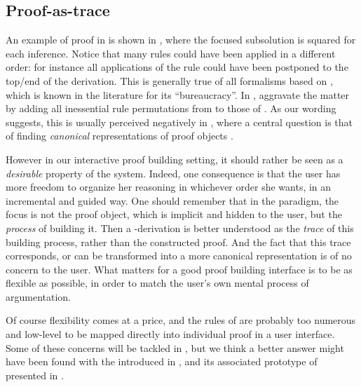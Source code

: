 \begin{scope}
\subsection{Proof-as-trace}

An example of proof in  is shown in , where the
focused subsolution is squared for each inference. Notice that many rules could
have been applied in a different order: for instance all applications of the
{} rule could have been postponed to the top/end of the derivation.
This is generally true of all formalisms based on , which is known in the
 literature for its ``bureaucracy''. In ,
 aggravate the matter by adding all inessential rule
permutations from  to those of . As our wording suggests,
this is usually perceived negatively in  , where a
central question is that of finding \emph{canonical} representations of proof
objects .

However in our interactive proof building setting, it should rather be seen as a
\emph{desirable} property of the system. Indeed, one consequence is that the
user has more freedom to organize her reasoning in whichever order she wants, in
an incremental and guided way. One should remember that in the
 paradigm, the focus is not the proof object, which is
implicit and hidden to the user, but the \emph{process} of building it. Then a
-derivation is better understood as the \emph{trace} of this building
process, rather than the constructed proof. And the fact that this trace corresponds, or
can be transformed into a more canonical representation is of no concern to the
user. What matters for a good proof building interface is to be as flexible as
possible, in order to match the user's own mental process of argumentation.

Of course flexibility comes at a price, and the rules of  are probably
too numerous and low-level to be mapped directly into individual proof 
in a user interface. Some of these concerns will be tackled in
, but we think a better answer might have been found
with the  introduced in , and its associated
prototype of  presented in .


\end{scope}
